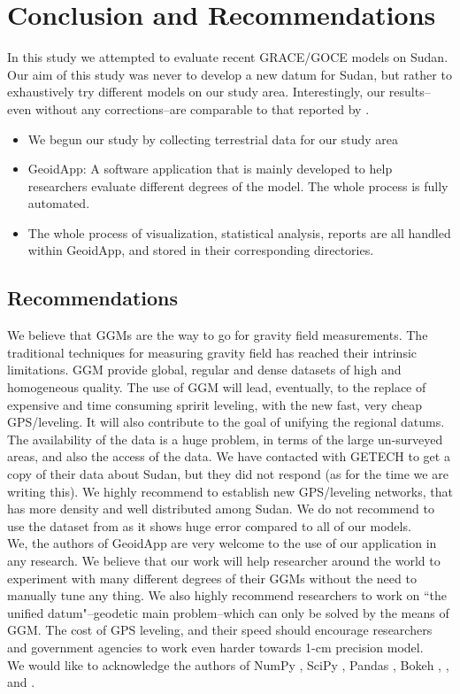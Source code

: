 \chapter{Conclusion and Recommendations}
\label{Chapter6}

In this study we attempted to evaluate recent GRACE/GOCE models on Sudan. Our aim of this study was never to develop a new datum for Sudan, but rather to exhaustively try different models on our study area. Interestingly, our results--even without any corrections--are comparable to that reported by \citep{ahmed_msc, godah}. 

\begin{itemize}
	\item We begun our study by collecting terrestrial data for our study area
	\item GeoidApp: A software application that is mainly developed to help researchers evaluate different degrees of the model. The whole process is fully automated.
	\item The whole process of visualization, statistical analysis, reports are all handled within GeoidApp, and stored in their corresponding directories.
\end{itemize}

\section{Recommendations}

We believe that GGMs are the way to go for gravity field measurements. The traditional techniques for measuring gravity field has reached their intrinsic limitations. GGM provide global, regular and dense datasets of high and homogeneous quality. The use of GGM will lead, eventually, to the replace of expensive and time consuming spririt leveling, with the new fast, very cheap GPS/leveling. It will also contribute to the goal of unifying the regional datums.
\\
The availability of the data is a huge problem, in terms of the large un-surveyed areas, and also the access of the data. We have contacted with GETECH to get a copy of their data about Sudan, but they did not respond (as for the time we are writing this). We highly recommend to establish new GPS/leveling networks, that has more density and well distributed among Sudan. We do not recommend to use the dataset from \citep{osman} as it shows huge error compared to all of our models. 
\\
We, the authors of GeoidApp are very welcome to the use of our application in any research. We believe that our work will help researcher around the world to experiment with many different degrees of their GGMs without the need to manually tune any thing. We also highly recommend researchers to work on ``the unified datum"--geodetic main problem--which can only be solved by the means of GGM. The cost of GPS leveling, and their speed should encourage researchers and government agencies to work even harder towards 1-cm precision model.
\\
We would like to acknowledge the authors of NumPy \cite{numpy}, SciPy \cite{scipy}, Pandas \cite{pandas}, Bokeh \cite{bokeh}, \cite{octave}, and \cite{ipython}.